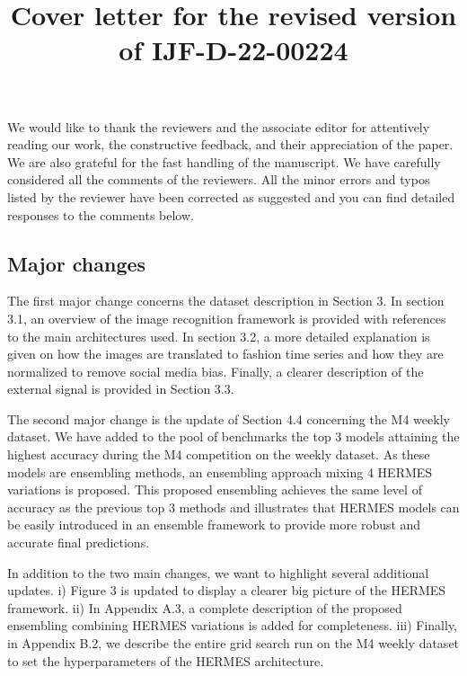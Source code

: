 \documentclass[11pt]{article}
\title{Cover letter for the revised version of IJF-D-22-00224}
\begin{document}
\maketitle

We would like to thank the reviewers and the associate editor for attentively reading our work, the constructive feedback, and their appreciation of the paper. We are also grateful for the fast handling of the manuscript.
We have carefully considered all the comments of the reviewers. All the minor errors and typos listed by the reviewer have been corrected as suggested and you can find detailed responses to the comments below.

\subsection*{Major changes}

The first major change concerns the dataset description in Section 3. In section 3.1, an overview of the image recognition framework is provided with references to the main architectures used. In section 3.2, a more detailed explanation is given on how the images are translated to fashion time series and how they are normalized to remove social media bias. Finally, a clearer description of the external signal is provided in Section 3.3.

The second major change is the update of Section 4.4 concerning the M4 weekly dataset. We have added to the pool of benchmarks the top 3 models attaining the highest accuracy during the M4 competition on the weekly dataset. As these models are ensembling methods, an ensembling approach mixing 4 HERMES variations is proposed. This proposed ensembling achieves the same level of accuracy as the previous top 3 methods and illustrates that HERMES models can be easily introduced in an ensemble framework to provide more robust and accurate final predictions. 

In addition to the two main changes, we want to highlight several additional updates. i) Figure 3 is updated to display a clearer big picture of the HERMES framework. ii) In Appendix A.3, a complete description of the proposed ensembling combining HERMES variations is added for completeness. iii) Finally, in Appendix B.2, we describe the entire grid search run on the M4 weekly dataset to set the hyperparameters of the HERMES architecture.
\end{document}
